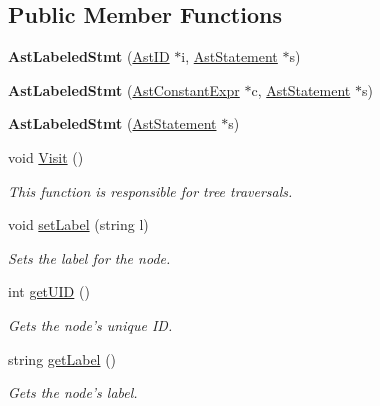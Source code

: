 \subsection*{Public Member Functions}
\begin{DoxyCompactItemize}
\item 
\hypertarget{classAstLabeledStmt_aca812c738648cde75efb63b54ea4083d}{{\bfseries Ast\-Labeled\-Stmt} (\hyperlink{classAstID}{Ast\-I\-D} $\ast$i, \hyperlink{classAstStatement}{Ast\-Statement} $\ast$s)}\label{classAstLabeledStmt_aca812c738648cde75efb63b54ea4083d}

\item 
\hypertarget{classAstLabeledStmt_a49285a53627a00f502fa04afb2a72d47}{{\bfseries Ast\-Labeled\-Stmt} (\hyperlink{classAstConstantExpr}{Ast\-Constant\-Expr} $\ast$c, \hyperlink{classAstStatement}{Ast\-Statement} $\ast$s)}\label{classAstLabeledStmt_a49285a53627a00f502fa04afb2a72d47}

\item 
\hypertarget{classAstLabeledStmt_a545ffe76c4ebdc254a554f655b1d19e4}{{\bfseries Ast\-Labeled\-Stmt} (\hyperlink{classAstStatement}{Ast\-Statement} $\ast$s)}\label{classAstLabeledStmt_a545ffe76c4ebdc254a554f655b1d19e4}

\item 
void \hyperlink{classAstLabeledStmt_a2477cd4279ec466452407604e0897261}{Visit} ()
\begin{DoxyCompactList}\small\item\em This function is responsible for tree traversals. \end{DoxyCompactList}\item 
void \hyperlink{classAST_a71d680856e95ff89f55d5311a552eba6}{set\-Label} (string l)
\begin{DoxyCompactList}\small\item\em Sets the label for the node. \end{DoxyCompactList}\item 
int \hyperlink{classAST_ab7a5b1d9f1c2de0d98deb356f724a42c}{get\-U\-I\-D} ()
\begin{DoxyCompactList}\small\item\em Gets the node's unique I\-D. \end{DoxyCompactList}\item 
string \hyperlink{classAST_aee029be902fffc927d16ccb03eb922ad}{get\-Label} ()
\begin{DoxyCompactList}\small\item\em Gets the node's label. \end{DoxyCompactList}\end{DoxyCompactItemize}
